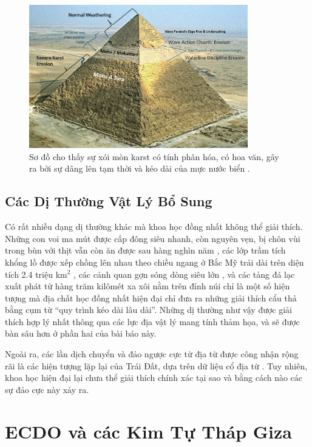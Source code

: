 \documentclass[10pt,twocolumn,letterpaper]{article}
\begin{document}
\begin{figure}[t]
\begin{center}
\includegraphics[width=0.85\textwidth]{khafre.jpg}
\end{center}
   \caption{Sơ đồ cho thấy sự xói mòn karst có tính phân hóa, có hoa văn, gây ra bởi sự dâng lên tạm thời và kéo dài của mực nước biển \cite{27}.}
\label{fig:4}
\end{figure}
\subsection{Các Dị Thường Vật Lý Bổ Sung}

Có rất nhiều dạng dị thường khác mà khoa học đồng nhất không thể giải thích. Những con voi ma mút được cấp đông siêu nhanh, còn nguyên vẹn, bị chôn vùi trong bùn với thịt vẫn còn ăn được sau hàng nghìn năm \cite{17,18,19}, các lớp trầm tích khổng lồ được xếp chồng lên nhau theo chiều ngang ở Bắc Mỹ trải dài trên diện tích 2.4 triệu km$^2$ \cite{21}, các cảnh quan gợn sóng dòng siêu lớn \cite{22}, và các tảng đá lạc xuất phát từ hàng trăm kilômét xa xôi nằm trên đỉnh núi \cite{23,26} chỉ là một số hiện tượng mà địa chất học đồng nhất hiện đại chỉ đưa ra những giải thích cẩu thả bằng cụm từ “quy trình kéo dài lâu dài”. Những dị thường như vậy được giải thích hợp lý nhất thông qua các lực địa vật lý mang tính thảm họa, và sẽ được bàn sâu hơn ở phần hai của bài báo này.

Ngoài ra, các lần dịch chuyển và đảo ngược cực từ địa từ được công nhận rộng rãi là các hiện tượng lặp lại của Trái Đất, dựa trên dữ liệu cổ địa từ \cite{35,40,41}. Tuy nhiên, khoa học hiện đại lại chưa thể giải thích chính xác tại sao và bằng cách nào các sự đảo cực này xảy ra.

\section{ECDO và các Kim Tự Tháp Giza}
\end{document}
